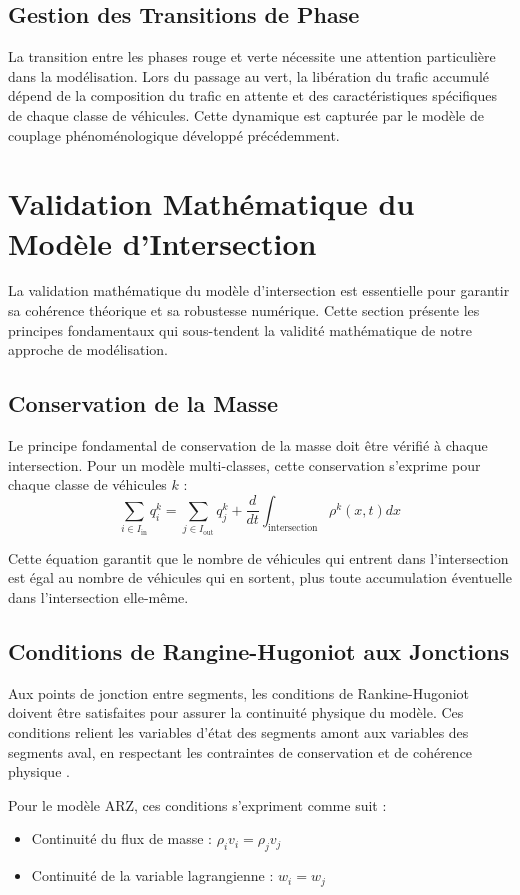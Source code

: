 \subsection{Gestion des Transitions de Phase}
La transition entre les phases rouge et verte nécessite une attention particulière dans la modélisation. Lors du passage au vert, la libération du trafic accumulé dépend de la composition du trafic en attente et des caractéristiques spécifiques de chaque classe de véhicules. Cette dynamique est capturée par le modèle de couplage phénoménologique développé précédemment.

\section{Validation Mathématique du Modèle d'Intersection}
La validation mathématique du modèle d'intersection est essentielle pour garantir sa cohérence théorique et sa robustesse numérique. Cette section présente les principes fondamentaux qui sous-tendent la validité mathématique de notre approche de modélisation.

\subsection{Conservation de la Masse}
Le principe fondamental de conservation de la masse doit être vérifié à chaque intersection. Pour un modèle multi-classes, cette conservation s'exprime pour chaque classe de véhicules $ k $ :
\[
\sum_{i \in I_{\text{in}}} q_i^k = \sum_{j \in I_{\text{out}}} q_j^k + \frac{d}{dt} \int_{\text{intersection}} \rho^k(x,t) dx
\]

Cette équation garantit que le nombre de véhicules qui entrent dans l'intersection est égal au nombre de véhicules qui en sortent, plus toute accumulation éventuelle dans l'intersection elle-même.

\subsection{Conditions de Rangine-Hugoniot aux Jonctions}
Aux points de jonction entre segments, les conditions de Rankine-Hugoniot doivent être satisfaites pour assurer la continuité physique du modèle. Ces conditions relient les variables d'état des segments amont aux variables des segments aval, en respectant les contraintes de conservation et de cohérence physique \cite{GaravelloPiccoli2006}.

Pour le modèle ARZ, ces conditions s'expriment comme suit :
\begin{itemize}
    \item Continuité du flux de masse : $ \rho_i v_i = \rho_j v_j $
    \item Continuité de la variable lagrangienne : $ w_i = w_j $
\end{itemize}


